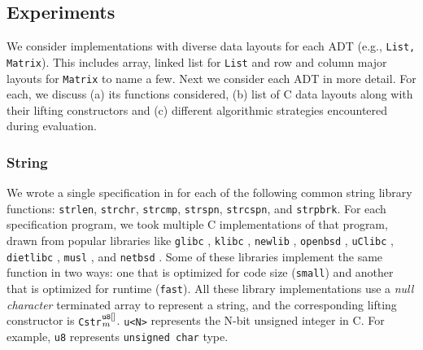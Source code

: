 \subsection{Experiments}
We consider implementations with diverse data layouts
for each \SpecL{} ADT (e.g., {\tt List, Matrix}).
This includes array, linked list for {\tt List} and
row and column major layouts for {\tt Matrix} to name a few.
Next we consider each ADT in more detail. For each, we discuss
(a) its functions considered, (b) list of C data layouts along with
their lifting constructors and (c) different algorithmic strategies
encountered during evaluation.




\subsubsection{String} We wrote a single specification in \SpecL{} for each of the
following
common string library functions: {\tt strlen}, {\tt strchr}, {\tt strcmp}, {\tt strspn},
{\tt strcspn}, and {\tt strpbrk}.  For each specification
program, we took multiple C implementations of that program, drawn from popular
libraries like {\tt glibc} \cite{glibc}, {\tt klibc} \cite{klibc}, {\tt newlib} \cite{newlib},
{\tt openbsd} \cite{openbsdlibc}, {\tt uClibc} \cite{uclibc},
{\tt dietlibc} \cite{dietlibc}, {\tt musl} \cite{musl}, and {\tt netbsd} \cite{netbsd}.
Some of these libraries implement the same function in two ways: one that is optimized
for code size ({\tt small}) and another that is optimized for runtime ({\tt fast}).
All these library implementations use a {\em null character} terminated array to represent
a string, and the
corresponding lifting constructor is {\tt Cstr}$^{\tt u8[]}_m$.
{\tt u<N>} represents the N-bit unsigned integer in C.
For example, {\tt u8} represents {\tt unsigned char} type.

